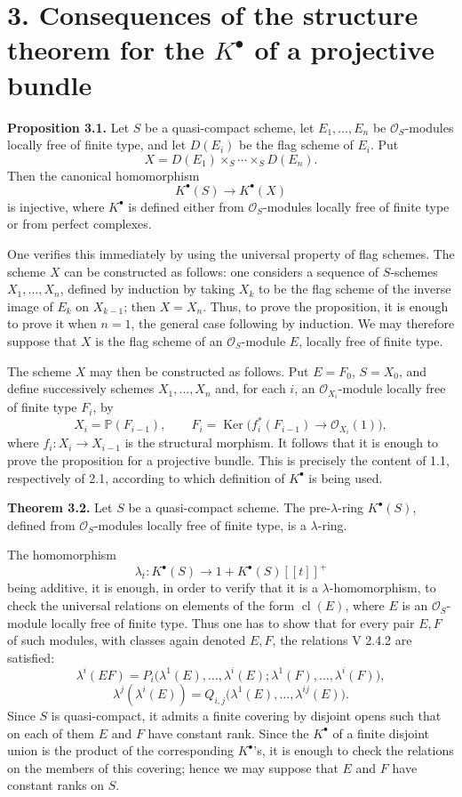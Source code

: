 \documentclass[11pt]{article}
\newcommand{\cl}{\operatorname{cl}}
\providecommand{\Ker}{\operatorname{Ker}}
\begin{document}
\section*{3. Consequences of the structure theorem for the \(K^\bullet\) of a projective bundle}

\textbf{Proposition 3.1.} Let \(S\) be a quasi-compact scheme, let \(E_1,\ldots,E_n\) be \(\mathcal O_S\)-modules locally free of finite type, and let \(D(E_i)\) be the flag scheme of \(E_i\). Put
\[
  X=D(E_1)\times_S\cdots\times_S D(E_n).
\]
Then the canonical homomorphism
\[
  K^\bullet(S)\longrightarrow K^\bullet(X)
\]
is injective, where \(K^\bullet\) is defined either from \(\mathcal O_S\)-modules locally free of finite type or from perfect complexes.

One verifies this immediately by using the universal property of flag schemes. The scheme \(X\) can be constructed as follows: one considers a sequence of \(S\)-schemes \(X_1,\ldots,X_n\), defined by induction by taking \(X_k\) to be the flag scheme of the inverse image of \(E_k\) on \(X_{k-1}\); then \(X=X_n\). Thus, to prove the proposition, it is enough to prove it when \(n=1\), the general case following by induction. We may therefore suppose that \(X\) is the flag scheme of an \(\mathcal O_S\)-module \(E\), locally free of finite type.

The scheme \(X\) may then be constructed as follows. Put \(E=F_0\), \(S=X_0\), and define successively schemes \(X_1,\ldots,X_n\) and, for each \(i\), an \(\mathcal O_{X_i}\)-module locally free of finite type \(F_i\), by
\[
  X_i=\mathbb P(F_{i-1}),\qquad
  F_i=\Ker\bigl(f_i^*(F_{i-1})\longrightarrow \mathcal O_{X_i}(1)\bigr),
\]
where \(f_i:X_i\to X_{i-1}\) is the structural morphism. It follows that it is enough to prove the proposition for a projective bundle. This is precisely the content of 1.1, respectively of 2.1, according to which definition of \(K^\bullet\) is being used.

\textbf{Theorem 3.2.} Let \(S\) be a quasi-compact scheme. The pre-\(\lambda\)-ring \(K^\bullet(S)\), defined from \(\mathcal O_S\)-modules locally free of finite type, is a \(\lambda\)-ring.

The homomorphism
\[
  \lambda_t:K^\bullet(S)\longrightarrow 1+K^\bullet(S)[[t]]^+
\]
being additive, it is enough, in order to verify that it is a \(\lambda\)-homomorphism, to check the universal relations on elements of the form \(\cl(E)\), where \(E\) is an \(\mathcal O_S\)-module locally free of finite type. Thus one has to show that for every pair \(E,F\) of such modules, with classes again denoted \(E,F\), the relations V 2.4.2 are satisfied:
\[
  \lambda^i(EF)=P_i\bigl(\lambda^1(E),\ldots,\lambda^i(E);\lambda^1(F),\ldots,\lambda^i(F)\bigr),
\]
\[
  \lambda^j(\lambda^i(E))=Q_{i,j}\bigl(\lambda^1(E),\ldots,\lambda^{ij}(E)\bigr).
\]
Since \(S\) is quasi-compact, it admits a finite covering by disjoint opens such that on each of them \(E\) and \(F\) have constant rank. Since the \(K^\bullet\) of a finite disjoint union is the product of the corresponding \(K^\bullet\)'s, it is enough to check the relations on the members of this covering; hence we may suppose that \(E\) and \(F\) have constant ranks on \(S\).
\end{document}
